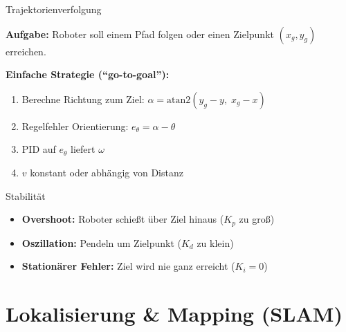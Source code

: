 \documentclass[%
  aspectratio=169,
  10pt
]{beamer}
\begin{document}
\begin{frame}{Trajektorienverfolgung}

\textbf{Aufgabe:} Roboter soll einem Pfad folgen
oder einen Zielpunkt $(x_g, y_g)$ erreichen.

\vspace{3mm}
\textbf{Einfache Strategie (``go-to-goal''):}
\begin{enumerate}
  \item Berechne Richtung zum Ziel:
        $\alpha = \mathrm{atan2}(y_g - y, \; x_g - x)$
  \item Regelfehler Orientierung:
        $e_\theta = \alpha - \theta$
  \item PID auf $e_\theta$ liefert $\omega$
  \item $v$ konstant oder abhängig von Distanz
\end{enumerate}

\vspace{3mm}
\begin{alertblock}{Stabilität}
  \begin{itemize}
    \item \textbf{Overshoot:} Roboter schießt über Ziel hinaus
          ($K_p$ zu groß)
    \item \textbf{Oszillation:} Pendeln um Zielpunkt ($K_d$ zu klein)
    \item \textbf{Stationärer Fehler:} Ziel wird nie ganz erreicht
          ($K_i = 0$)
  \end{itemize}
\end{alertblock}

\end{frame}


\section{Lokalisierung \& Mapping (SLAM)}
\end{document}
